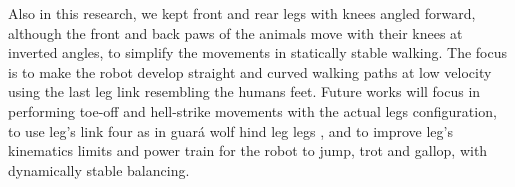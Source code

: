   Also in this research, we kept front and rear legs with knees angled forward, although the front and back paws of the animals move with their knees at inverted angles, to simplify the movements in statically stable walking. The focus is to make the robot develop straight and curved walking paths at low velocity using the last leg link resembling the humans	 feet. Future works will focus in performing toe-off and hell-strike movements with the actual legs configuration, to use leg's link four as in guar\'a wolf hind leg legs , and to improve leg's kinematics limits and power train for the robot to jump, trot and gallop, with dynamically stable balancing.
\begin{figure}[t]
	\centering
\end{figure}
